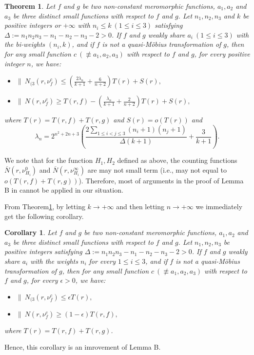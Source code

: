 \documentclass[12pt,leqno]{amsart}
\newtheorem{corollary}[equation]{Corollary}
\newtheorem{theorem}[equation]{Theorem}
\numberwithin{equation}{section}
\begin{document}
\begin{theorem}\label{1.1}  Let $f$ and $g$ be two non-constant meromorphic functions, $a_1, a_2$ and $a_3$ be three distinct small functions with respect to $f$ and $g$. Let $n_1,n_2,n_3$ and $k$ be positive integers or $+\infty$ with $n_i\le k\ (1\le i\le 3)$ satisfying $\Delta:=n_1n_2n_3-n_1-n_2-n_3-2>0$. If $f$ and $g$ weakly share $a_i\ (1\le i\le 3)$  with the bi-weights $(n_i,k)$, and if $f$ is not a quasi-M\"{o}bius transformation of $g$, then for any small function $c\ (\not\equiv a_1,a_2,a_3)$ with respect to $f$ and $g$, for every positive integer $n$, we have:
\begin{itemize}
\item[(a)] $\|\ N_{(3}(r,\nu^c_f)\le\left(\frac{2\lambda_n}{k+1}+\frac{6}{n+2}\right)T(r)+S(r),$
    \item[(b)] $\|\ N(r, \nu^c_f)\ge T(r,f)-\left(\frac{\lambda_n}{k+1}+\frac{2}{n+2}\right)T(r)+S(r),$
\end{itemize}
where $T(r)=T(r,f)+T(r,g)$ and $S(r)=o(T(r))$ and
$$\lambda_n=2^{n^2+2n+3}\left(\frac{2\sum_{1\le i<j\le 3}(n_i+1)(n_j+1)}{\Delta(k+1)}+\frac{3}{k+1}\right).$$
\end{theorem}
We note that for the function $H_1,H_2$ defined as above, the counting functions $\overline N(r,\nu^0_{H_i})$ and $\overline N(r,\nu^\infty_{H_i})$ are may not small term (i.e., may not equal to $o(T(r,f)+T(r,g))$). Therefore, most of arguments in the proof of Lemma B in \cite{LY2} cannot be applied in our situation. 

From Theorem\ref{1.1}, by letting $k\rightarrow +\infty$ and then letting $n\rightarrow +\infty$ we immediately get the following corollary.

\begin{corollary} Let $f$ and $g$ be two non-constant meromorphic functions, $a_1, a_2$ and $a_3$ be three distinct small functions with respect to $f$ and $g$. Let $n_1,n_2,n_3$ be positive integers satisfying $\Delta:=n_1n_2n_3-n_1-n_2-n_3-2>0$. If $f$ and $g$ weakly share $a_i$  with the weights $n_i$ for every $1\le i\le 3$, and if $f$ is not a quasi-M\"{o}bius transformation of $g$, then for any small function $c\ (\not\equiv a_1,a_2,a_3)$ with respect to $f$ and $g$, for every $\epsilon>0$, we have:
\begin{itemize}
\item[(a)] $\|\ N_{(3}(r,\nu^c_f)\le \epsilon T(r),$
    \item[(b)] $\|\ N(r, \nu^c_f)\ge (1- \epsilon)T(r,f),$
\end{itemize}
where $T(r)=T(r,f)+T(r,g)$.
\end{corollary}
Hence, this corollary is an imrovement of Lemma B. 
\end{document}
